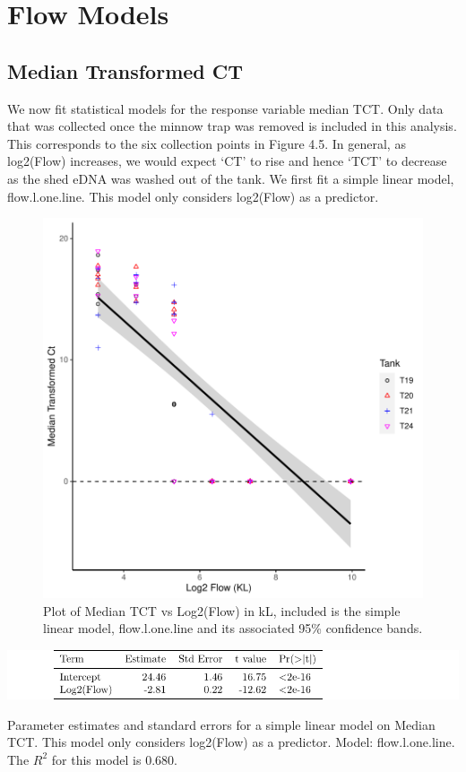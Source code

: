\section{Flow Models}
\subsection{Median Transformed CT}


We now fit statistical models for the response variable median TCT. Only data that was collected once the minnow trap was removed is included in this analysis. This corresponds to the six collection points in Figure 4.5. In general, as log2(Flow) increases, we would expect `CT' to rise and hence `TCT' to decrease as the shed eDNA was washed out of the tank. We first fit a simple linear model, flow.l.one.line. This model only considers log2(Flow) as a predictor.



\begin{figure}[H]
\includegraphics[scale=0.8]{Chapter4Images/flowmedtctgg.pdf}
\caption{Plot of Median TCT vs Log2(Flow) in kL, included is the simple linear model, flow.l.one.line and its associated 95\% confidence bands.}
\label{fig:flowmedtct}
\end{figure}


\begin{table}[H]
\includegraphics{Chapter4Images/flowloneline.pdf}
\caption{Parameter estimates and standard errors for a simple linear model on Median TCT. This model only considers log2(Flow) as a predictor. Model: flow.l.one.line. The $R^{2}$ for this model is 0.680.}
\label{fig:flow11}
\end{table}

